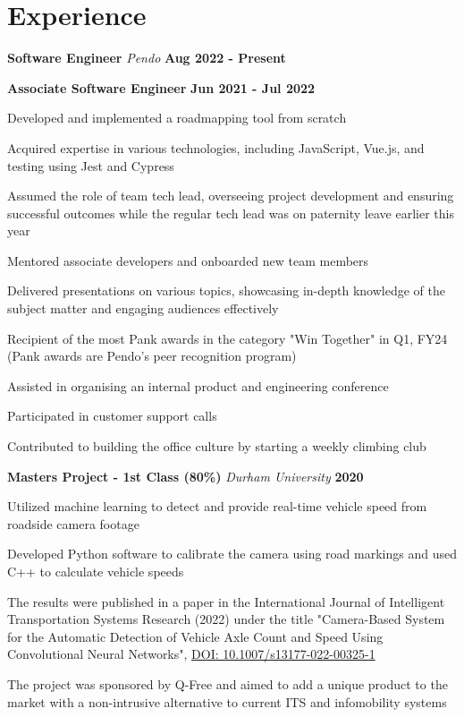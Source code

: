 \documentclass[a4paper, 11pt, hidelinks]{article}
\newcommand{\textsb}[1]{
	\fontseries{sb}\selectfont #1 \normalfont
}
\newcommand{\xp}[3]{
	\vspace{0.5em}
	\textbf{\Large#1} \quad \emph{\large#2} \hfill \textbf{\large#3}
}
\begin{document}
\begin{minipage}{0.587\textwidth}
	\vspace{-0.25em}

	\section{Experience}
	\vspace{0.5em}
	\xp{Software Engineer}{Pendo}{Aug 2022 - Present}

	\xp{Associate Software Engineer}{}{Jun 2021 - Jul 2022}
	\begin{itemise}
		\item    Developed and implemented a roadmapping tool from scratch
		\item    Acquired expertise in various technologies, including JavaScript, Vue.js, and testing using Jest and Cypress
		\item    Assumed the role of team tech lead, overseeing project development and ensuring successful outcomes while the regular tech lead was on paternity leave earlier this year
		\item    Mentored associate developers and onboarded new team members
		\item    Delivered presentations on various topics, showcasing in-depth knowledge of the subject matter and engaging audiences effectively
		\item    Recipient of the most Pank awards in the category "Win Together" in Q1, FY24 (Pank awards are Pendo's peer recognition program)
		\item    Assisted in organising an internal product and engineering conference
		\item    Participated in customer support calls
		\item    Contributed to building the office culture by starting a weekly climbing club
	\end{itemise}
	\xp{Masters Project - 1st Class (80\%)}{Durham University}{2020}
	\begin{itemise}
		\item Utilized machine learning to detect and provide real-time vehicle speed from roadside camera footage
		\item Developed Python software to calibrate the camera using road markings and used C++ to calculate vehicle speeds
		\item The results were published in a paper in the International Journal of Intelligent Transportation Systems Research \textsb{20}(2022) under the title "Camera-Based System for the Automatic Detection of Vehicle Axle Count and Speed Using Convolutional Neural Networks", \href{https://doi.org/10.1007/s13177-022-00325-1}{DOI: 10.1007/s13177-022-00325-1 \faExternalLink}
		\item The project was sponsored by Q-Free and aimed to add a unique product to the market with a non-intrusive alternative to current ITS and infomobility systems
		

\end{itemise}
\end{minipage}
\end{document}
